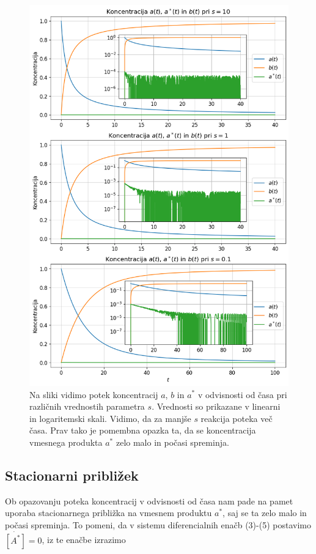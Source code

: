 \documentclass[slovene,11pt,a4paper]{article}
\begin{document}
\begin{figure}[h!]
\centering
\includegraphics[width=15cm]{binarna1.png}
\caption{Na sliki vidimo potek koncentracij $a$, $b$ in $a^*$ v odvisnosti od časa pri različnih vrednostih parametra $s$. Vrednosti so prikazane v linearni in logaritemski skali. Vidimo, da za manjše $s$ reakcija poteka več časa. Prav tako je pomembna opazka ta, da se koncentracija vmesnega produkta $a^*$ zelo malo in počasi spreminja.}
\end{figure}

\newpage

\subsection{Stacionarni približek}

Ob opazovanju poteka koncentracij v odvisnosti od časa nam pade na pamet uporaba stacionarnega približka na vmesnem produktu $a^*$, saj se ta zelo malo in počasi spreminja. To pomeni, da v sistemu diferencialnih enačb (3)-(5) postavimo $\dot{[A^*]} = 0$, iz te enačbe izrazimo
\end{document}
